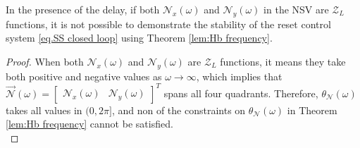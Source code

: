 \begin{lemma}
    \label{NxNyZl}
    In the presence of the delay, if both $\mathcal{N}_x (\omega)$ and $\mathcal{N}_y (\omega)$ in the NSV are $\mathcal{Z}_L$ functions, it is not possible to demonstrate the stability of the reset control system \eqref{eq.SS closed loop} using Theorem \ref{lem:Hb frequency}. 
\end{lemma}
\begin{proof}
    \label{P.NxNyZl}
    When both $\mathcal{N}_x (\omega)$ and $\mathcal{N}_y (\omega)$ are $\mathcal{Z}_L$ functions, it means they take both positive and negative values as $\omega \rightarrow \infty$, which implies that $\stackrel{\rightarrow}{\mathcal{N}}(\omega)=\begin{bmatrix}
        \mathcal{N}_x (\omega) & \mathcal{N}_y (\omega)
    \end{bmatrix}^T$ spans all four quadrants. Therefore, $\theta_{\mathcal{N}} (\omega)$ takes all values in $(0,2\pi]$, and non of the constraints on $\theta_{\mathcal{N}} (\omega)$ in Theorem \ref{lem:Hb frequency} cannot be satisfied.\\
\end{proof}

